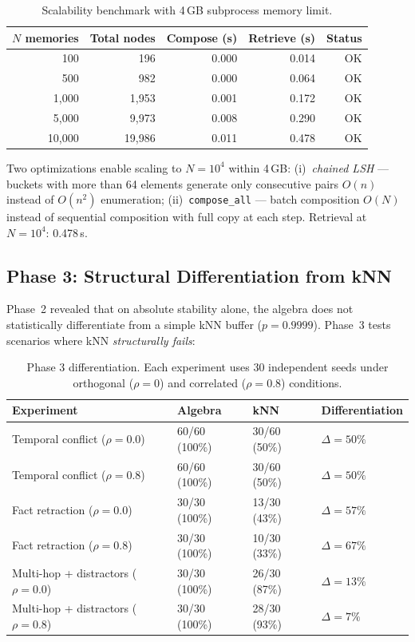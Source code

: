 \documentclass[11pt,a4paper]{article}
\theoremstyle{definition}
\begin{document}
\begin{table}[h]
\centering
\begin{tabular}{rrrrr}
\toprule
$N$ memories & Total nodes & Compose (s) & Retrieve (s) & Status \\
\midrule
100 & 196 & 0.000 & 0.014 & OK \\
500 & 982 & 0.000 & 0.064 & OK \\
1{,}000 & 1{,}953 & 0.001 & 0.172 & OK \\
5{,}000 & 9{,}973 & 0.008 & 0.290 & OK \\
10{,}000 & 19{,}986 & 0.011 & 0.478 & OK \\
\bottomrule
\end{tabular}
\caption{Scalability benchmark with 4\,GB subprocess memory limit.}
\end{table}

Two optimizations enable scaling to $N = 10^4$ within 4\,GB: (i)~\emph{chained LSH} --- buckets with more than 64 elements generate only consecutive pairs $O(n)$ instead of $O(n^2)$ enumeration; (ii)~\texttt{compose\_all} --- batch composition $O(N)$ instead of sequential composition with full copy at each step. Retrieval at $N = 10^4$: 0.478\,s.

\subsection{Phase 3: Structural Differentiation from kNN}

Phase~2 revealed that on absolute stability alone, the algebra does not statistically differentiate from a simple kNN buffer ($p = 0.9999$). Phase~3 tests scenarios where kNN \emph{structurally fails}:

\begin{table}[h]
\centering
\begin{tabular}{llll}
\toprule
\textbf{Experiment} & \textbf{Algebra} & \textbf{kNN} & \textbf{Differentiation} \\
\midrule
Temporal conflict ($\rho=0.0$) & 60/60 (100\%) & 30/60 (50\%) & $\Delta = 50\%$ \\
Temporal conflict ($\rho=0.8$) & 60/60 (100\%) & 30/60 (50\%) & $\Delta = 50\%$ \\
Fact retraction ($\rho=0.0$) & 30/30 (100\%) & 13/30 (43\%) & $\Delta = 57\%$ \\
Fact retraction ($\rho=0.8$) & 30/30 (100\%) & 10/30 (33\%) & $\Delta = 67\%$ \\
Multi-hop + distractors ($\rho=0.0$) & 30/30 (100\%) & 26/30 (87\%) & $\Delta = 13\%$ \\
Multi-hop + distractors ($\rho=0.8$) & 30/30 (100\%) & 28/30 (93\%) & $\Delta = 7\%$ \\
\bottomrule
\end{tabular}
\caption{Phase 3 differentiation. Each experiment uses 30 independent seeds under orthogonal ($\rho=0$) and correlated ($\rho=0.8$) conditions.}
\end{table}
\end{document}
